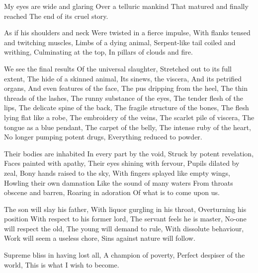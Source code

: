 \documentclass{article}
\newenvironment{stanza}{\begin{minipage}{10cm}\obeylines}{\end{minipage}\vspace{\baselineskip}}
\begin{document}
\begin{stanza}
My eyes are wide and glaring
Over a telluric mankind
That matured and finally reached
The end of its cruel story.
\end{stanza}

\begin{stanza}
As if his shoulders and neck
Were twisted in a fierce impulse,
With flanks tensed and twitching muscles,
Limbs of a dying animal,
Serpent-like tail coiled and writhing,
Culminating at the top,
In pillars of clouds and fire.
\end{stanza}

\begin{stanza}
We see the final results
Of the universal slaughter,
Stretched out to its full extent,
The hide of a skinned animal,
Its sinews, the viscera,
And its petrified organs,
And even features of the face,
The pus dripping from the heel,
The thin threads of the lashes,
The runny substance of the eyes,
The tender flesh of the lips,
The delicate spine of the back,
The fragile structure of the bones,
The flesh lying flat like a robe,
The embroidery of the veins,
The scarlet pile of viscera,
The tongue as a blue pendant,
The carpet of the belly,
The intense ruby of the heart,
No longer pumping potent drugs,
Everything reduced to powder.
\end{stanza}

\begin{stanza}
Their bodies are inhabited
In every part by the void,
Struck by potent revelation,
Faces painted with apathy,
Their eyes shining with fervour,
Pupils dilated by zeal,
Bony hands raised to the sky,
With fingers splayed like empty wings,
Howling their own damnation
Like the sound of many waters
From throats obscene and barren,
Roaring in adoration
Of what is to come upon us.
\end{stanza}

\begin{stanza}
The son will slay his father,
With liquor gurgling in his throat,
Overturning his position
With respect to his former lord,
The servant feels he is master,
No-one will respect the old,
The young will demand to rule,
With dissolute behaviour,
Work will seem a useless chore,
Sins against nature will follow.
\end{stanza}

\begin{stanza}
Supreme bliss in having lost all,
A champion of poverty,
Perfect despiser of the world,
This is what I wish to become.
\end{stanza}
\end{document}
